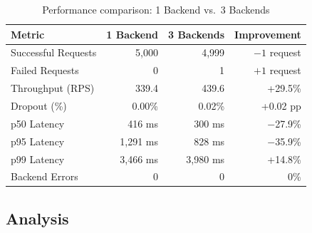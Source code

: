 \documentclass[12pt,a4paper]{article}
\begin{document}
\begin{table}[H]
\centering
\caption{Performance comparison: 1 Backend vs.\ 3 Backends}
\label{tab:comparison}
\begin{tabular}{lrrr}
\toprule
\textbf{Metric} & \textbf{1 Backend} & \textbf{3 Backends} & \textbf{Improvement} \\
\midrule
Successful Requests & 5,000        & 4,999        & $-1$ request \\
Failed Requests     & 0            & 1            & $+1$ request \\
Throughput (RPS)    & 339.4        & 439.6        & +29.5\% \\
Dropout (\%)        & 0.00\%       & 0.02\%       & +0.02 pp \\
p50 Latency         & 416 ms       & 300 ms       & $-$27.9\% \\
p95 Latency         & 1,291 ms     & 828 ms       & $-$35.9\% \\
p99 Latency         & 3,466 ms     & 3,980 ms     & +14.8\% \\
Backend Errors      & 0            & 0            & 0\% \\
\bottomrule
\end{tabular}
\end{table}

\subsection{Analysis}
\end{document}
